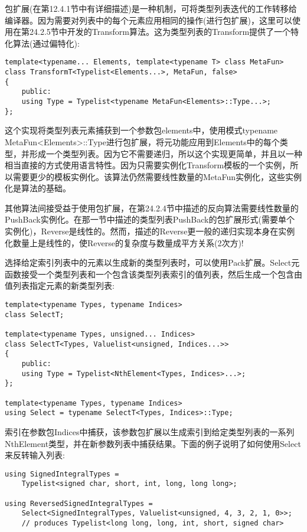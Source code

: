 包扩展(在第12.4.1节中有详细描述)是一种机制，可将类型列表迭代的工作转移给编译器。因为需要对列表中的每个元素应用相同的操作(进行包扩展)，这里可以使用在第24.2.5节中开发的Transform算法。这为类型列表的Transform提供了一个特化算法(通过偏特化):

\begin{lstlisting}[style=styleCXX]
template<typename... Elements, template<typename T> class MetaFun>
class TransformT<Typelist<Elements...>, MetaFun, false>
{
	public:
	using Type = Typelist<typename MetaFun<Elements>::Type...>;
};
\end{lstlisting}

这个实现将类型列表元素捕获到一个参数包elements中，使用模式typename MetaFun<Elements>::Type进行包扩展，将元功能应用到Elements中的每个类型，并形成一个类型列表。因为它不需要递归，所以这个实现更简单，并且以一种相当直接的方式使用语言特性。因为只需要实例化Transform模板的一个实例，所以需要更少的模板实例化。该算法仍然需要线性数量的MetaFun实例化，这些实例化是算法的基础。

其他算法间接受益于使用包扩展，在第24.2.4节中描述的反向算法需要线性数量的PushBack实例化。在那一节中描述的类型列表PushBack的包扩展形式(需要单个实例化)，Reverse是线性的。然而，描述的Reverse更一般的递归实现本身在实例化数量上是线性的，使Reverse的复杂度与数量成平方关系(2次方)!

选择给定索引列表中的元素以生成新的类型列表时，可以使用Pack扩展。Select元函数接受一个类型列表和一个包含该类型列表索引的值列表，然后生成一个包含由值列表指定元素的新类型列表:

\begin{lstlisting}[style=styleCXX]
template<typename Types, typename Indices>
class SelectT;

template<typename Types, unsigned... Indices>
class SelectT<Types, Valuelist<unsigned, Indices...>>
{
	public:
	using Type = Typelist<NthElement<Types, Indices>...>;
};

template<typename Types, typename Indices>
using Select = typename SelectT<Types, Indices>::Type;
\end{lstlisting}

索引在参数包Indices中捕获，该参数包扩展以生成索引到给定类型列表的一系列NthElement类型，并在新参数列表中捕获结果。下面的例子说明了如何使用Select来反转输入列表:

\begin{lstlisting}[style=styleCXX]
using SignedIntegralTypes =
	Typelist<signed char, short, int, long, long long>;

using ReversedSignedIntegralTypes =
	Select<SignedIntegralTypes, Valuelist<unsigned, 4, 3, 2, 1, 0>>;
	// produces Typelist<long long, long, int, short, signed char>
\end{lstlisting}

